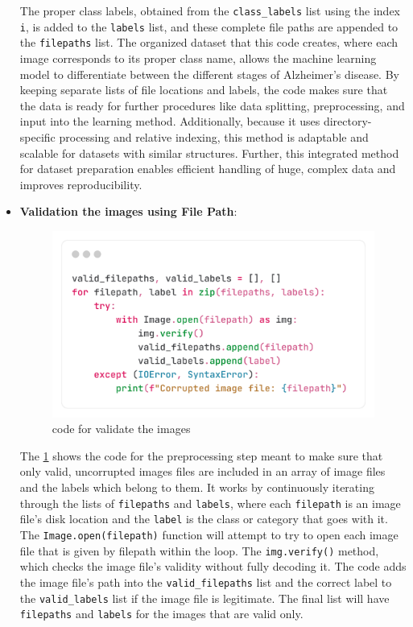 \documentclass[12pt,onecolumn]{report}
\begin{document}
\begin{itemize}
    The proper class labels, obtained from the \texttt{class\_labels} list using the index \texttt{i}, is added to the \texttt{labels} list, and these complete file paths are appended to the \texttt{filepaths} list. The organized dataset that this code creates, where each image corresponds to its proper class name, allows the machine learning model to differentiate between the different stages of Alzheimer's disease. By keeping separate lists of file locations and labels, the code makes sure that the data is ready for further procedures like data splitting, preprocessing, and input into the learning method. Additionally, because it uses directory-specific processing and relative indexing, this method is adaptable and scalable for datasets with similar structures. Further, this integrated method for dataset preparation enables efficient handling of huge, complex data and improves reproducibility.
    \item \textbf{Validation the images using File Path}: 
    \begin{figure}[h!]
        \centering
        \includegraphics[width=0.6\columnwidth]{figures/validating_images.png}  %
        \caption{code for validate the images} %
        \label{fig:validating_the_image_using_image_paths} %
    \end{figure}
    The \ref{fig:validating_the_image_using_image_paths} shows the code for the preprocessing step meant to make sure that only valid, uncorrupted images files are included in an array of image files and the labels which belong to them. It works by continuously iterating through the lists of \texttt{filepaths} and \texttt{labels}, where each \texttt{filepath} is an image file's disk location and the \texttt{label} is the class or category that goes with it. The \texttt{Image.open(filepath)} function will attempt to try to open each image file that is given by filepath within the loop. The \texttt{img.verify()} method, which checks the image file's validity without fully decoding it. The code adds the image file's path into the \texttt{valid\_filepaths} list and the correct label to the \texttt{valid\_labels} list if the image file is legitimate. The final list will have \texttt{filepaths} and \texttt{labels} for the images that are valid only.


\end{itemize}
\end{document}
